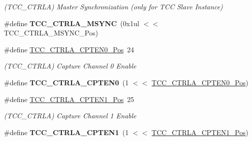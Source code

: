 \begin{DoxyCompactItemize}
\begin{DoxyCompactList}\small\item\em (T\+C\+C\+\_\+\+C\+T\+R\+L\+A) Master Synchronization (only for T\+C\+C Slave Instance) \end{DoxyCompactList}\item 
\hypertarget{group___s_a_m_l21___t_c_c_ga5009c1a7d4952a7cf1d1467a6d018911}{}\#define {\bfseries T\+C\+C\+\_\+\+C\+T\+R\+L\+A\+\_\+\+M\+S\+Y\+N\+C}~(0x1ul $<$$<$ T\+C\+C\+\_\+\+C\+T\+R\+L\+A\+\_\+\+M\+S\+Y\+N\+C\+\_\+\+Pos)\label{group___s_a_m_l21___t_c_c_ga5009c1a7d4952a7cf1d1467a6d018911}

\item 
\hypertarget{group___s_a_m_l21___t_c_c_ga710fa15e87d40278df1dd84bee749423}{}\#define \hyperlink{group___s_a_m_l21___t_c_c_ga710fa15e87d40278df1dd84bee749423}{T\+C\+C\+\_\+\+C\+T\+R\+L\+A\+\_\+\+C\+P\+T\+E\+N0\+\_\+\+Pos}~24\label{group___s_a_m_l21___t_c_c_ga710fa15e87d40278df1dd84bee749423}

\begin{DoxyCompactList}\small\item\em (T\+C\+C\+\_\+\+C\+T\+R\+L\+A) Capture Channel 0 Enable \end{DoxyCompactList}\item 
\hypertarget{group___s_a_m_l21___t_c_c_ga4294dfad0ae93d7002c99b773d92603a}{}\#define {\bfseries T\+C\+C\+\_\+\+C\+T\+R\+L\+A\+\_\+\+C\+P\+T\+E\+N0}~(1 $<$$<$ \hyperlink{group___s_a_m_l21___t_c_c_ga710fa15e87d40278df1dd84bee749423}{T\+C\+C\+\_\+\+C\+T\+R\+L\+A\+\_\+\+C\+P\+T\+E\+N0\+\_\+\+Pos})\label{group___s_a_m_l21___t_c_c_ga4294dfad0ae93d7002c99b773d92603a}

\item 
\hypertarget{group___s_a_m_l21___t_c_c_ga7fbcf8f49aaab28875a43f8cf0c7b125}{}\#define \hyperlink{group___s_a_m_l21___t_c_c_ga7fbcf8f49aaab28875a43f8cf0c7b125}{T\+C\+C\+\_\+\+C\+T\+R\+L\+A\+\_\+\+C\+P\+T\+E\+N1\+\_\+\+Pos}~25\label{group___s_a_m_l21___t_c_c_ga7fbcf8f49aaab28875a43f8cf0c7b125}

\begin{DoxyCompactList}\small\item\em (T\+C\+C\+\_\+\+C\+T\+R\+L\+A) Capture Channel 1 Enable \end{DoxyCompactList}\item 
\hypertarget{group___s_a_m_l21___t_c_c_ga275b06193a65313c447a483c84f7d3a1}{}\#define {\bfseries T\+C\+C\+\_\+\+C\+T\+R\+L\+A\+\_\+\+C\+P\+T\+E\+N1}~(1 $<$$<$ \hyperlink{group___s_a_m_l21___t_c_c_ga7fbcf8f49aaab28875a43f8cf0c7b125}{T\+C\+C\+\_\+\+C\+T\+R\+L\+A\+\_\+\+C\+P\+T\+E\+N1\+\_\+\+Pos})\label{group___s_a_m_l21___t_c_c_ga275b06193a65313c447a483c84f7d3a1}


\end{DoxyCompactItemize}
